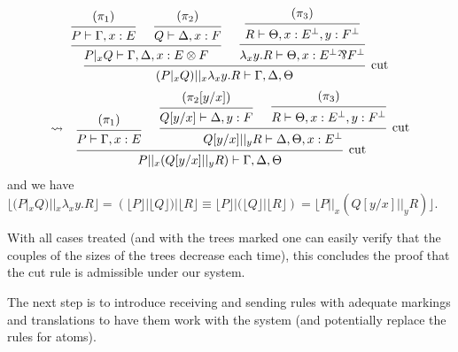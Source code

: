 \documentclass[a4paper,12pt]{article}
\begin{document}
\begin{myproof}
\begin{itemize}
			\[
				\begin{prooftree}
							\hypo{(\pi_1)}
						\infer1{P \vdash \Gamma,x:E}
							\hypo{(\pi_2)}
						\infer1{Q \vdash \Delta,x:F}
					\infer2{P|_xQ \vdash \Gamma,\Delta,x:E\logtensor F}
							\hypo{(\pi_3)}
						\infer1{R \vdash \Theta,x:E^\bot,y:F^\bot}
					\infer1{\lambda_xy.R \vdash \Theta,x:E^\bot\logpar F^\bot}
				\infer2[cut]{(P|_xQ)||_x\lambda_xy.R \vdash \Gamma,\Delta,\Theta}
				\end{prooftree}
			\]\[
				\leadsto\;\;\;
				\begin{prooftree}
						\hypo{(\pi_1)}
					\infer1{P \vdash \Gamma,x:E}
							\hypo{(\pi_2[y/x])}
						\infer1{Q[y/x] \vdash \Delta,y:F}
							\hypo{(\pi_3)}
						\infer1{R \vdash \Theta,x:E^\bot,y:F^\bot}
					\infer2[cut]{Q[y/x]||_yR \vdash \Delta,\Theta,x:E^\bot}
				\infer2[cut]{P||_x(Q[y/x]||_yR) \vdash \Gamma,\Delta,\Theta}
				\end{prooftree}
			\]
			and we have\\
			$\lfloor (P|_xQ)||_x\lambda_xy.R \rfloor = (\lfloor P \rfloor|\lfloor Q \rfloor)|\lfloor R \rfloor \equiv \lfloor P \rfloor|(\lfloor Q \rfloor|\lfloor R \rfloor) = \lfloor P||_x(Q[y/x]||_yR) \rfloor$.
	\end{itemize}
With all cases treated (and with the trees marked one can easily verify that the couples of the sizes of the trees decrease each time), this concludes the proof that the cut rule is admissible under our system.
\end{myproof}
\remark The next step is to introduce receiving and sending rules with adequate markings and translations to have them work with the system (and potentially replace the rules for atoms).

\newpage
\end{document}
